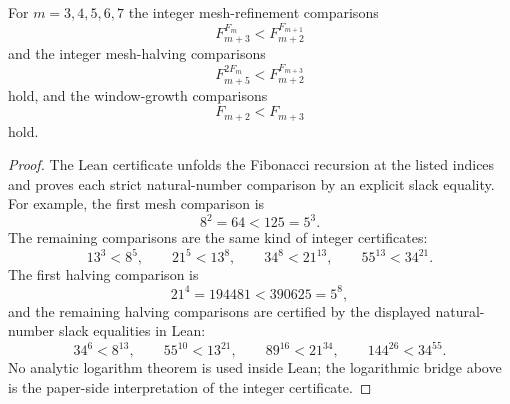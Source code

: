 \begin{theorem}
\label{thm:fibonacci-window-mesh-refinement-bricks}
For $m=3,4,5,6,7$ the integer mesh-refinement comparisons
$$
F_{m+3}^{F_m}<F_{m+2}^{F_{m+1}}
$$
and the integer mesh-halving comparisons
$$
F_{m+5}^{2F_m}<F_{m+2}^{F_{m+3}}
$$
hold, and the window-growth comparisons
$$
F_{m+2}<F_{m+3}
$$
hold.
\end{theorem}
\begin{proof}
The Lean certificate unfolds the Fibonacci recursion at the listed indices and proves each strict natural-number comparison by an explicit slack equality. For example, the first mesh comparison is
$$
8^2=64<125=5^3.
$$
The remaining comparisons are the same kind of integer certificates:
$$
13^3<8^5,\qquad 21^5<13^8,\qquad 34^8<21^{13},\qquad 55^{13}<34^{21}.
$$
The first halving comparison is
$$
21^4=194481<390625=5^8,
$$
and the remaining halving comparisons are certified by the displayed natural-number slack equalities in Lean:
$$
34^6<8^{13},\qquad 55^{10}<13^{21},\qquad 89^{16}<21^{34},\qquad 144^{26}<34^{55}.
$$
No analytic logarithm theorem is used inside Lean; the logarithmic bridge above is the paper-side interpretation of the integer certificate.
\end{proof}


